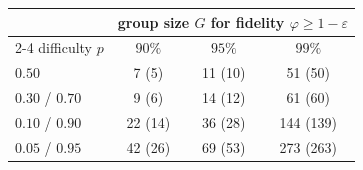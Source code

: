 \begin{tabular}{lccc}
\toprule
 & \multicolumn{3}{c}{group size $G$ for fidelity $\varphi\ge 1-\varepsilon$} \\
\cmidrule(lr){2-4}
difficulty $p$ & $90\%$ & $95\%$ & $99\%$ \\
\midrule
$0.50$ & 7 (5) & 11 (10) & 51 (50) \\
$0.30$ / $0.70$ & 9 (6) & 14 (12) & 61 (60) \\
$0.10$ / $0.90$ & 22 (14) & 36 (28) & 144 (139) \\
$0.05$ / $0.95$ & 42 (26) & 69 (53) & 273 (263) \\
\bottomrule
\end{tabular}

